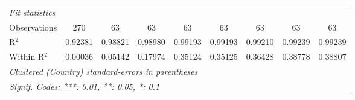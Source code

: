 \begin{table}[htbp]
\begin{tabular}{lcccccccc}
      \midrule
      \emph{Fit statistics}\\
      Observations                                                                    & 270      & 63       & 63              & 63              & 63              & 63              & 63              & 63\\  
      R$^2$                                                                           & 0.92381  & 0.98821  & 0.98980         & 0.99193         & 0.99193         & 0.99210         & 0.99239         & 0.99239\\  
      Within R$^2$                                                                    & 0.00036  & 0.05142  & 0.17974         & 0.35124         & 0.35125         & 0.36428         & 0.38778         & 0.38807\\  
      \midrule \midrule
      \multicolumn{9}{l}{\emph{Clustered (Country) standard-errors in parentheses}}\\
      \multicolumn{9}{l}{\emph{Signif. Codes: ***: 0.01, **: 0.05, *: 0.1}}\\
   \end{tabular}
\end{table}


